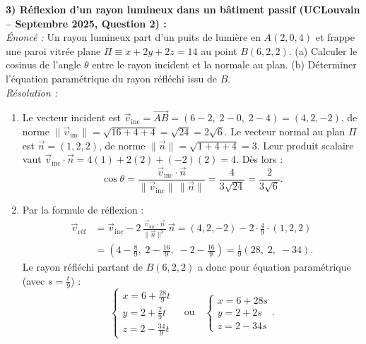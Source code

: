 \begin{exemple}
\medskip
\textbf{3) Réflexion d'un rayon lumineux dans un bâtiment passif (UCLouvain -- Septembre 2025, Question 2) :}\\
\emph{Énoncé :} Un rayon lumineux part d'un puits de lumière en $A(2, 0, 4)$ et frappe une paroi vitrée plane $\Pi \equiv x + 2y + 2z = 14$ au point $B(6, 2, 2)$. (a) Calculer le cosinus de l'angle $\theta$ entre le rayon incident et la normale au plan. (b) Déterminer l'équation paramétrique du rayon réfléchi issu de $B$.\\
\emph{Résolution :}
\begin{enumerate}[label=(\alph*)]
    \item Le vecteur incident est $\vec{v}_{\text{inc}} = \overrightarrow{AB} = (6-2,\; 2-0,\; 2-4) = (4, 2, -2)$, de norme $\|\vec{v}_{\text{inc}}\| = \sqrt{16+4+4} = \sqrt{24} = 2\sqrt{6}$. Le vecteur normal au plan $\Pi$ est $\vec{n} = (1, 2, 2)$, de norme $\|\vec{n}\| = \sqrt{1+4+4} = 3$. Leur produit scalaire vaut $\vec{v}_{\text{inc}} \cdot \vec{n} = 4(1) + 2(2) + (-2)(2) = 4$. Dès lors :
    \[
        \cos\theta = \frac{\vec{v}_{\text{inc}} \cdot \vec{n}}{\|\vec{v}_{\text{inc}}\|\,\|\vec{n}\|} = \frac{4}{3\sqrt{24}} = \boxed{\frac{2}{3\sqrt{6}}}.
    \]
    \item Par la formule de réflexion :
    \begin{align*}
        \vec{v}_{\text{réf}} &= \vec{v}_{\text{inc}} - 2\,\frac{\vec{v}_{\text{inc}}\cdot\vec{n}}{\|\vec{n}\|^2}\,\vec{n} = (4, 2, -2) - 2\cdot\frac{4}{9}\cdot(1, 2, 2) \\
        &= \left(4 - \frac{8}{9},\; 2 - \frac{16}{9},\; -2 - \frac{16}{9}\right) = \frac{1}{9}(28,\; 2,\; -34).
    \end{align*}
    Le rayon réfléchi partant de $B(6, 2, 2)$ a donc pour équation paramétrique (avec $s = \frac{t}{9}$) :
    \[
        \boxed{\begin{cases} x = 6 + \frac{28}{9}t \\ y = 2 + \frac{2}{9}t \\ z = 2 - \frac{34}{9}t \end{cases} \quad \text{ou} \quad \begin{cases} x = 6 + 28s \\ y = 2 + 2s \\ z = 2 - 34s \end{cases}}.
    \]
\end{enumerate}
\end{exemple}

